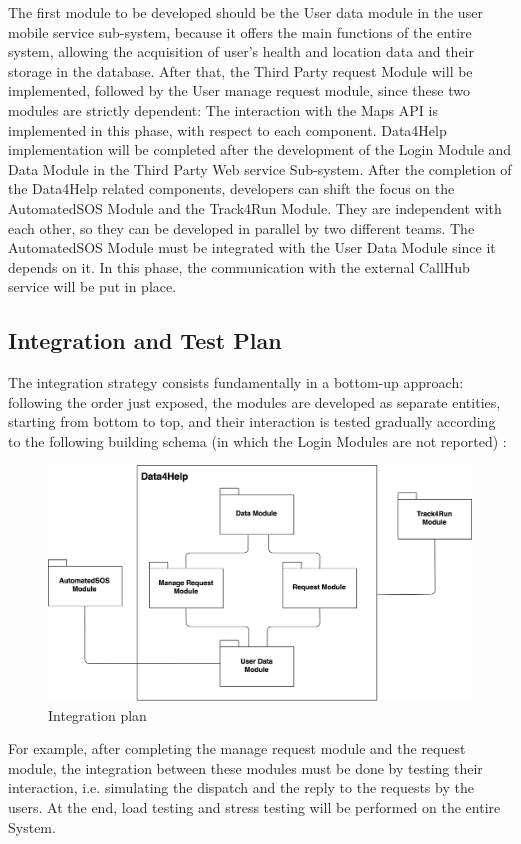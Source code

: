 \vspace{4mm}
The first module to be developed should be the User data module in the user mobile service sub-system, because it offers the main functions of the entire system, allowing the acquisition of user's health and location data and their storage in the database.
After that, the Third Party request Module will be implemented, followed by the User manage request module, since these two modules are strictly dependent:
The interaction with the Maps API is implemented in this phase, with respect to each component.
Data4Help implementation will be completed after the development of the Login Module and Data Module in the Third Party Web service Sub-system.
After the completion of the Data4Help related components, developers can shift the focus on the AutomatedSOS Module and the Track4Run Module. They are independent with each other, so they can be developed in parallel by two different teams.
The AutomatedSOS Module must be integrated with the User Data Module since it depends on it. In this phase, the communication with the external CallHub service will be put in place. 


\subsection{Integration and Test Plan}
The integration strategy consists fundamentally in a bottom-up approach: following the order just exposed, the modules are developed as separate entities, starting from bottom to top, and their interaction is tested gradually according to the following building schema (in which the Login Modules are not reported) :

\begin{figure}[H]
\includegraphics[scale=0.19,keepaspectratio]{./Pictures/integration.png}
\centering
\caption{Integration plan}
\end{figure}
 
For example, after completing the manage request module and the request module, the integration between these modules must be done by testing their interaction, i.e. simulating the dispatch and the reply to the requests by the users. 
At the end, load testing and stress testing will be performed on the entire System.

